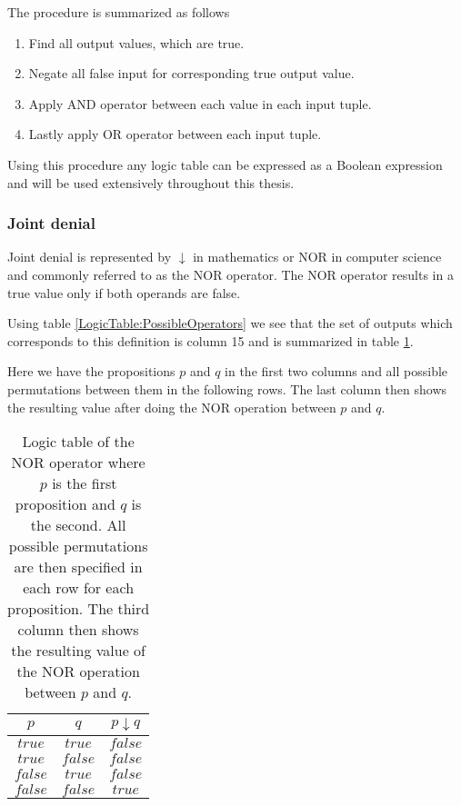                 The procedure is summarized as follows
                \begin{enumerate}
                    \item Find all output values, which are true.
                    \item Negate all false input for corresponding true output value.
                    \item Apply AND operator between each value in each input tuple.
                    \item Lastly apply OR operator between each input tuple.
                \end{enumerate}
                Using this procedure any logic table can be expressed as a Boolean expression and will be used extensively throughout this thesis.
                
            \subsubsection{Joint denial}
                Joint denial is represented by $\downarrow$ in mathematics or NOR in computer science and commonly referred to as the NOR operator. The NOR operator results in a true value only if both operands are false.
                
                Using table \ref{LogicTable:PossibleOperators} we see that the set of outputs which corresponds to this definition is column 15 and is summarized in table \ref{LogicTable:NOR}.
                
                Here we have the propositions $p$ and $q$ in the first two columns and all possible permutations between them in the following rows. The last column then shows the resulting value after doing the NOR operation between $p$ and $q$.
                
                \begin{table}[h!]
                    \centering
                    \begin{tabular}{|c|c|c|}
                    	\hline
                    	  $p$   &   $q$   & $p \downarrow q$ \\ \hline
                    	$true$  & $true$  &     $false$      \\ \hline
                    	$true$  & $false$ &     $false$      \\ \hline
                    	$false$ & $true$  &     $false$      \\ \hline
                    	$false$ & $false$ &      $true$      \\ \hline
                    \end{tabular}
                    \caption{Logic table of the NOR operator where $p$ is the first proposition and $q$ is the second. All possible permutations are then specified in each row for each proposition. The third column then shows the resulting value of the NOR operation between $p$ and $q$.}
                    \label{LogicTable:NOR}
                \end{table}
            

